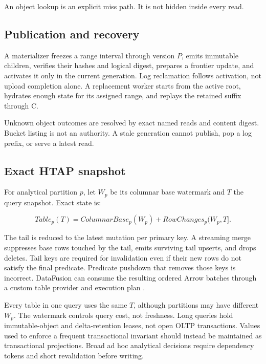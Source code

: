 \documentclass[sigconf,nonacm]{acmart}
\newcommand{\cversion}{C}
\begin{document}
An object lookup is an explicit miss path. It is not hidden inside every read.

\subsection{Publication and recovery}

A materializer freezes a range interval through version $P$, emits immutable
children, verifies their hashes and logical digest, prepares a frontier update,
and activates it only in the current generation. Log reclamation follows
activation, not upload completion alone. A replacement worker starts from the
active root, hydrates enough state for its assigned range, and replays the
retained suffix through \cversion{}.

Unknown object outcomes are resolved by exact named reads and content digest.
Bucket listing is not an authority. A stale generation cannot publish, pop a log
prefix, or serve a latest read.

\subsection{Exact HTAP snapshot}

For analytical partition $p$, let $W_p$ be its columnar base watermark and $T$
the query snapshot. Exact state is:

\begin{equation}
  Table_p(T)=ColumnarBase_p(W_p)+RowChanges_p(W_p,T].
  \label{eq:htap}
\end{equation}

The tail is reduced to the latest mutation per primary key. A streaming merge
suppresses base rows touched by the tail, emits surviving tail upserts, and
drops deletes. Tail keys are required for invalidation even if their new rows do
not satisfy the final predicate. Predicate pushdown that removes those keys is
incorrect. DataFusion can consume the resulting ordered Arrow batches through a
custom table provider and execution plan \cite{datafusion2024,arrow2016}.

Every table in one query uses the same $T$, although partitions may have
different $W_p$. The watermark controls query cost, not freshness. Long queries
hold immutable-object and delta-retention leases, not open OLTP transactions.
Values used to enforce a frequent transactional invariant should instead be
maintained as transactional projections. Broad ad hoc analytical decisions
require dependency tokens and short revalidation before writing.
\end{document}
